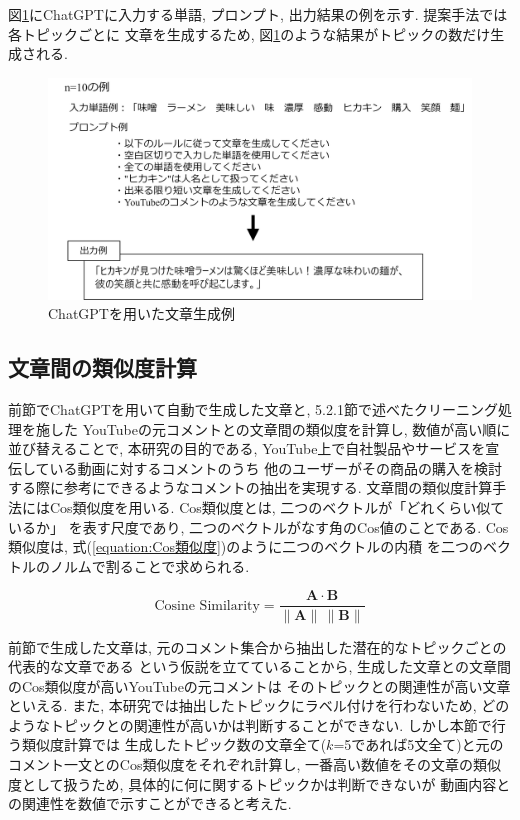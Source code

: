 \documentclass{ltjarticle}
\begin{document}
図\ref{fig:文章生成}にChatGPTに入力する単語, プロンプト, 出力結果の例を示す. 提案手法では各トピックごとに
文章を生成するため, 図\ref{fig:文章生成}のような結果がトピックの数だけ生成される. 
\begin{figure}[h]
    \centering
    \includegraphics[width = 14.6cm]{images/文章生成.drawio.png}
    \caption{ChatGPTを用いた文章生成例}
    \label{fig:文章生成}
\end{figure}

\newpage
\subsection{文章間の類似度計算}
前節でChatGPTを用いて自動で生成した文章と, 5.2.1節で述べたクリーニング処理を施した
YouTubeの元コメントとの文章間の類似度を計算し, 数値が高い順に並び替えることで, 本研究の目的である, 
YouTube上で自社製品やサービスを宣伝している動画に対するコメントのうち
他のユーザーがその商品の購入を検討する際に参考にできるようなコメントの抽出を実現する. 
文章間の類似度計算手法にはCos類似度を用いる. Cos類似度とは, 二つのベクトルが「どれくらい似ているか」
を表す尺度であり, 二つのベクトルがなす角のCos値のことである. Cos類似度は, 式(\ref{equation:Cos類似度})のように二つのベクトルの内積
を二つのベクトルのノルムで割ることで求められる. 
\vspace{5truept}

\begin{equation}
    \textrm{Cosine\ Similarity} = \dfrac{\boldsymbol{A}\cdot \boldsymbol{B}}{\|\boldsymbol{A}\|\,\|\boldsymbol{B}\|}
    \label{equation:Cos類似度}
\end{equation}
\vspace{5truept}

前節で生成した文章は, 元のコメント集合から抽出した潜在的なトピックごとの代表的な文章である
という仮説を立てていることから, 生成した文章との文章間のCos類似度が高いYouTubeの元コメントは
そのトピックとの関連性が高い文章といえる. また, 本研究では抽出したトピックにラベル付けを行わないため, 
どのようなトピックとの関連性が高いかは判断することができない. しかし本節で行う類似度計算では
生成したトピック数の文章全て($k$=5であれば5文全て)と元のコメント一文とのCos類似度をそれぞれ計算し, 
一番高い数値をその文章の類似度として扱うため, 具体的に何に関するトピックかは判断できないが
動画内容との関連性を数値で示すことができると考えた. 
\end{document}
